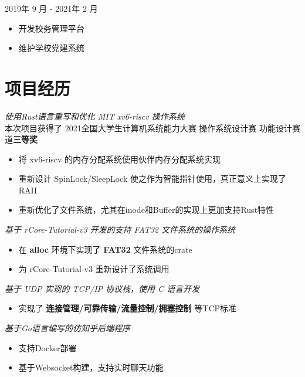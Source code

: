 \documentclass{cv}
\begin{document}
 {2019年 9 月 - 2021年 2 月}

\begin{itemize}
  \item 开发校务管理平台
  \item 维护学校党建系统
\end{itemize}


\section{项目经历}

{\it 使用Rust语言重写和优化 MIT xv6-riscv 操作系统}
\vspace{0.4ex}
\\
本次项目获得了 2021全国大学生计算机系统能力大赛 操作系统设计赛 功能设计赛道\textbf{三等奖}
\begin{itemize}
  \item 将 xv6-riscv 的内存分配系统使用伙伴内存分配系统实现
  \item 重新设计 SpinLock/SleepLock 使之作为智能指针使用，真正意义上实现了 RAII
  \item 重新优化了文件系统，尤其在inode和Buffer的实现上更加支持Rust特性
\end{itemize}


{\it 基于 rCore-Tutorial-v3 开发的支持 FAT32 文件系统的操作系统}
\vspace{0.4ex}
\begin{itemize}
  \item 在 \textbf{alloc} 环境下实现了 \textbf{FAT32} 文件系统的crate
  \item 为 rCore-Tutorial-v3 重新设计了系统调用
\end{itemize}


{\it 基于 UDP 实现的 TCP/IP 协议栈，使用 C 语言开发}
\vspace{0.4ex}
\begin{itemize}
  \item 实现了 \textbf{连接管理/可靠传输/流量控制/拥塞控制} 等TCP标准
\end{itemize}


{\it 基于Go语言编写的仿知乎后端程序}
\vspace{0.4ex}
\begin{itemize}
  \item 支持Docker部署
  \item 基于Websocket构建，支持实时聊天功能
\end{itemize}
\end{document}
